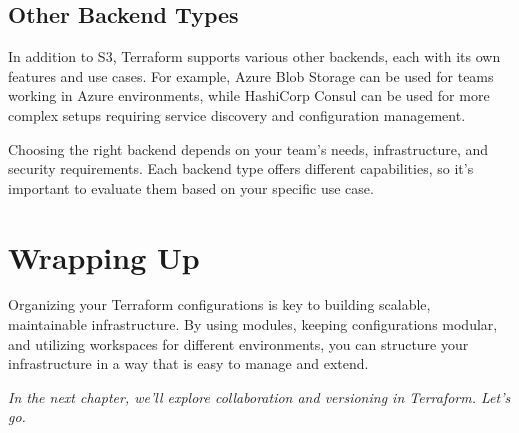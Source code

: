 \subsection{Other Backend Types}

In addition to S3, Terraform supports various other backends, each with its own features and use cases. For example, Azure Blob Storage can be used for teams working in Azure environments, while HashiCorp Consul can be used for more complex setups requiring service discovery and configuration management.

Choosing the right backend depends on your team's needs, infrastructure, and security requirements. Each backend type offers different capabilities, so it's important to evaluate them based on your specific use case.

\section{Wrapping Up}

Organizing your Terraform configurations is key to building scalable, maintainable infrastructure. By using modules, keeping configurations modular, and utilizing workspaces for different environments, you can structure your infrastructure in a way that is easy to manage and extend.

\vspace{1em}

\textit{In the next chapter, we'll explore collaboration and versioning in Terraform. Let's go.}
